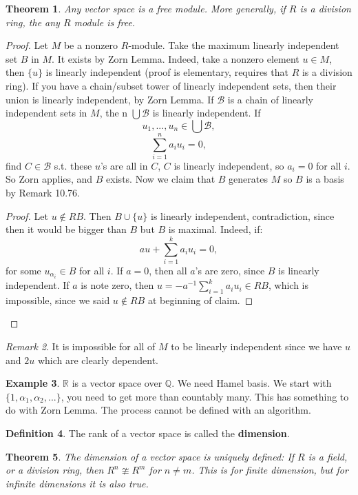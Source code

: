 \documentclass[12pt]{amsbook}
\theoremstyle{plain}
\newtheorem{theorem}{Theorem}[chapter]
\numberwithin{section}{chapter}
\numberwithin{equation}{chapter}
\theoremstyle{definition}
\newtheorem{Def}[theorem]{Definition}
\newtheorem{Ex}[theorem]{Example}
\theoremstyle{remark}
\newtheorem{rem}[theorem]{Remark}
\newcommand{\R}{\mathbb{R}}
\begin{document}
\begin{theorem}
Any vector space is a free module. More generally, if $R$ is a division ring, the any $R$ module is free. 
\end{theorem}
\begin{proof}
Let $M$ be a nonzero $R$-module.
Take the maximum linearly independent set $B$ in $M$. It exists by Zorn Lemma. Indeed, take a nonzero element $u \in M$, then $\{u\}$ is linearly independent (proof is elementary, requires that $R$ is a division ring). If you have a chain/subset tower of linearly independent sets, then their union is linearly independent, by Zorn Lemma. If $\mathcal{B}$ is a chain of linearly independent sets in $M$, the n $\bigcup \mathcal{B}$ is linearly independent. If 
$$
u_1,...,u_n \in \bigcup \mathcal{B},
$$
$$
\sum_{i  = 1}^na_i u_i = 0,
$$
 find $C \in \mathcal{B}$ s.t. these $u$'s are all in $C$, $C$ is linearly independent, so $a_i = 0$ for all $i$. So Zorn applies, and $B$ exists. Now we claim that $B$ generates $M$ so $B$ is a basis by Remark 10.76. 
 \begin{proof}
 Let $u \notin RB$. Then $B\cup \{u\}$ is linearly independent, contradiction, since then it would be bigger than $B$ but $B$ is maximal. 
 Indeed, if: 
 $$
 au + \sum_{i  = 1}^k a_i u_i = 0,
 $$
  for some $u_{\alpha_i} \in B$ for all $i$. If $a = 0$, then all $a$'s are zero, since $B$ is linearly independent. If $a$ is note zero, then $u = -a^{-1}\sum_{i  = 1}^k a_i u_i\in RB$, which is impossible, since we said $u \notin RB$ at beginning of claim. 
   \end{proof}
\end{proof}

\begin{rem}
It is impossible for all of $M$ to be linearly independent since we have $u$ and $2u$ which are clearly dependent. 
\end{rem}

\begin{Ex}
$\R$ is a vector space over $\mathbb{Q}$. We need Hamel basis. We start with $\{1,\alpha_1,\alpha_2,...\}$, you need to get more than countably many. This has something to do with Zorn Lemma. The process cannot be defined with an algorithm. 
\end{Ex}

\begin{Def}
The rank of a vector space is called the \textbf{dimension}. 
\end{Def}

\begin{theorem}
The dimension of a vector space is uniquely defined: If $R$ is a field, or a division ring, then $R^n \ncong R^m$ for $n \neq m$. This is for finite  dimension, but for infinite dimensions it is also true. 
\end{theorem}
\end{document}

